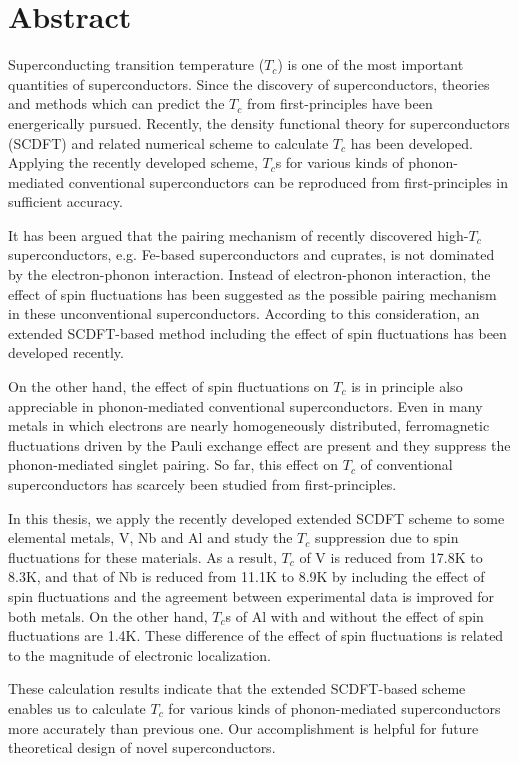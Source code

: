 


\chapter*{Abstract}

Superconducting transition temperature ($T_{c}$) is one of the most important quantities of superconductors. 
Since the discovery of superconductors, theories and methods which can predict the $T_c$ from
first-principles have been energerically pursued. Recently, the density functional theory for 
superconductors (SCDFT) and related numerical scheme to calculate $T_c$ has been developed. Applying the recently 
developed scheme, $T_c$s for various kinds of phonon-mediated conventional superconductors can be 
reproduced from first-principles in sufficient accuracy.

It has been argued that the pairing mechanism of recently discovered high-$T_c$ 
superconductors, e.g. Fe-based superconductors and cuprates, is not dominated by the electron-phonon 
interaction. Instead of electron-phonon interaction, the effect of spin fluctuations has been suggested
as the possible pairing mechanism in these unconventional superconductors. According to this 
consideration, an extended SCDFT-based method including the effect of spin fluctuations has been 
developed recently.

On the other hand, the effect of spin fluctuations on $T_c$ is in principle also appreciable in 
phonon-mediated conventional superconductors. 
Even in many metals in which electrons are nearly homogeneously distributed, ferromagnetic fluctuations
driven by the Pauli exchange effect are present and they suppress the phonon-mediated singlet pairing. 
So far, this effect on $T_c$ of conventional superconductors has scarcely been studied from first-principles.

In this thesis, we apply the recently developed extended SCDFT scheme to some elemental metals, V, Nb and Al 
and study the $T_c$ suppression due to spin fluctuations for these materials. As a result,
$T_c$ of V is reduced from 17.8K to 8.3K, and that of Nb is reduced from 11.1K to 8.9K by including
the effect of spin fluctuations and the agreement between experimental data is improved for both 
metals. On the other hand, $T_c$s of Al with and without the effect of spin fluctuations are 1.4K.
These difference of
the effect of spin fluctuations is related to the magnitude of electronic localization.

These calculation results indicate that the extended SCDFT-based scheme enables us to calculate  
$T_c$ for various kinds of phonon-mediated superconductors more accurately than previous one. Our 
accomplishment is helpful for future theoretical design of novel superconductors.




\clearpage


